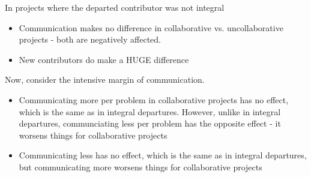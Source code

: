 \documentclass[12pt,notitlepage]{article}
\begin{document}
In projects where the departed contributor was not integral
\begin{itemize}
    \item Communication makes no difference in collaborative vs. uncollaborative projects - both are negatively affected. 
    \item New contributors do make a HUGE difference
\end{itemize}

Now, consider the intensive margin of communication.
\begin{itemize}
    \item Communicating more per problem in collaborative projects has no effect, which is the same as in integral departures. However, unlike in integral departures, communciating less per problem has the opposite effect - it worsens things for collaborative projects
    \item Communicating less has no effect, which is the same as in integral departures, but communicating more worsens things for collaborative projects 
\end{itemize}



\end{document}
